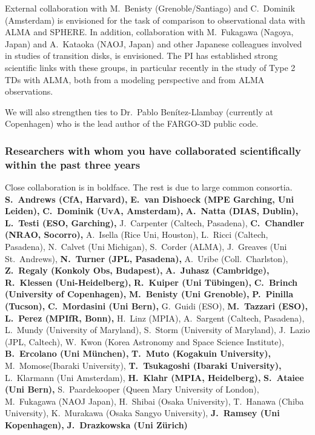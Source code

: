 \documentclass[10pt,fleqn,twoside]{article}
\begin{document}
External collaboration with M.~Benisty (Grenoble/Santiago) and C.~Dominik
(Amsterdam) is envisioned for the task of comparison to observational data
with ALMA and SPHERE.  In addition, collaboration with M.~Fukagawa (Nagoya,
Japan) and A.~Kataoka (NAOJ, Japan) and other Japanese colleagues involved
in studies of transition disks, is envisioned. The PI has established strong
scientific links with these groups, in particular recently in the study of
Type 2 TDs with ALMA, both from a modeling perspective and from ALMA
observations.

We will also strengthen ties to Dr.~Pablo Ben\'itez-Llambay (currently
at Copenhagen) who is the lead author of the FARGO-3D public code. 



\subsubsection{Researchers with whom you have collaborated scientifically within the past three years}

{\small
Close collaboration is in boldface. The rest is due to large common consortia.\\
{\bf S.~Andrews (CfA, Harvard),}
{\bf E.~van Dishoeck (MPE Garching, Uni Leiden),}
{\bf C.~Dominik (UvA, Amsterdam),}
{\bf A.~Natta (DIAS, Dublin),}
{\bf L.~Testi (ESO, Garching),}
J.~Carpenter (Caltech, Pasadena),
{\bf C.~Chandler (NRAO, Socorro),}
A.~Isella (Rice Uni, Houston),
L.~Ricci (Caltech, Pasadena),
N.~Calvet (Uni Michigan),
S.~Corder (ALMA),
J.~Greaves (Uni St.~Andrews),
{\bf N.~Turner (JPL, Pasadena),}
A.~Uribe (Coll.~Charlston),
{\bf Z.~Regaly (Konkoly Obs, Budapest),}
{\bf A.~Juhasz (Cambridge),}
{\bf R.~Klessen (Uni-Heidelberg),}
{\bf R.~Kuiper (Uni T\"ubingen),}
{\bf C.~Brinch (University of Copenhagen),}
{\bf M.~Benisty (Uni Grenoble),}
{\bf P.~Pinilla (Tucson),}
{\bf C.~Mordasini (Uni Bern),}
G.~Guidi (ESO),
{\bf M.~Tazzari (ESO),}
{\bf L.~Perez (MPIfR, Bonn),}
H.~Linz (MPIA),
A.~Sargent (Caltech, Pasadena),
L.~Mundy (University of Maryland),
S.~Storm (University of Maryland),
J.~Lazio (JPL, Caltech),
W.~Kwon (Korea Astronomy and Space Science Institute),
{\bf B.~Ercolano (Uni M\"unchen),}
{\bf T.~Muto (Kogakuin University),}
M.~Momose(Ibaraki University),
{\bf T.~Tsukagoshi (Ibaraki University),}
L.~Klarmann (Uni Amsterdam),
{\bf H.~Klahr (MPIA, Heidelberg),}
{\bf S.~Ataiee (Uni Bern),}
S.~Paardekooper (Queen Mary University of London),
M.~Fukagawa (NAOJ Japan),
H.~Shibai (Osaka University),
T.~Hanawa (Chiba University),
K.~Murakawa (Osaka Sangyo University),
{\bf J.~Ramsey (Uni Kopenhagen),}
{\bf J.~Drazkowska (Uni Z\"urich)}
}
\end{document}
